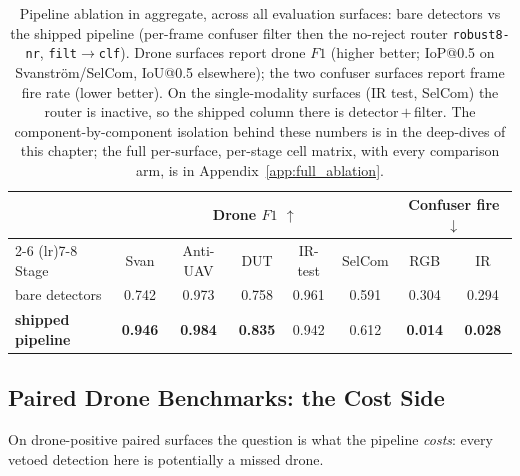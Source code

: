 \begin{table}[htbp]
    \centering
    \caption{Pipeline ablation in aggregate, across all evaluation surfaces: bare detectors vs the shipped pipeline (per-frame confuser filter then the no-reject router \texttt{robust8-nr}, \texttt{filt$\to$clf}). Drone surfaces report drone $F1$ (higher better; IoP@0.5 on Svanstr\"om/SelCom, IoU@0.5 elsewhere); the two confuser surfaces report frame fire rate (lower better). On the single-modality surfaces (IR test, SelCom) the router is inactive, so the shipped column there is detector\,$+$\,filter. The component-by-component isolation behind these numbers is in the deep-dives of this chapter; the full per-surface, per-stage cell matrix, with every comparison arm, is in Appendix~\ref{app:full_ablation}.}
    \label{tab:ablation_overview}
    \footnotesize
    \begin{tabular}{lccccccc}
        \toprule
        & \multicolumn{5}{c}{Drone $F1$ $\uparrow$} & \multicolumn{2}{c}{Confuser fire $\downarrow$} \\
        \cmidrule(lr){2-6} \cmidrule(lr){7-8}
        Stage & Svan & Anti-UAV & DUT & IR-test & SelCom & RGB & IR \\
        \midrule
        bare detectors & 0.742 & 0.973 & 0.758 & 0.961 & 0.591 & 0.304 & 0.294 \\
        \textbf{shipped pipeline} & \textbf{0.946} & \textbf{0.984} & \textbf{0.835} & 0.942 & 0.612 & \textbf{0.014} & \textbf{0.028} \\
        \bottomrule
    \end{tabular}
    \normalsize
\end{table}

\subsection{Paired Drone Benchmarks: the Cost Side}
\label{sec:pipeline_paired}

On drone-positive paired surfaces the question is what the pipeline \emph{costs}: every vetoed detection here is potentially a missed drone.



